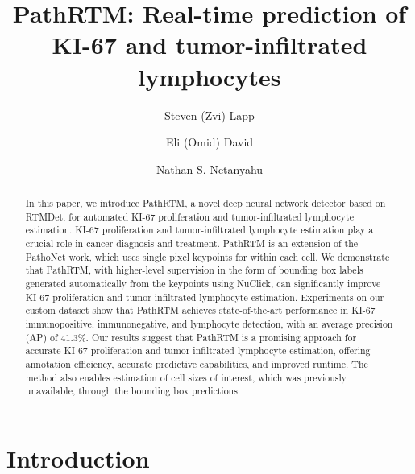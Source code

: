 \documentclass[runningheads]{llncs}
\begin{document}
%
\title{PathRTM: Real-time prediction of KI-67 and tumor-infiltrated lymphocytes}
%
%
\author{Steven (Zvi) Lapp \and
	Eli (Omid) David \and
	Nathan S. Netanyahu}
%
%
%
\maketitle              %
%
\begin{abstract}
	In this paper, we introduce PathRTM, a novel deep neural network detector based on RTMDet, for automated KI-67 proliferation and tumor-infiltrated lymphocyte estimation. KI-67 proliferation and tumor-infiltrated lymphocyte estimation play a crucial role in cancer diagnosis and treatment. PathRTM is an extension of the PathoNet work, which uses single pixel keypoints for within each cell. We demonstrate that PathRTM, with higher-level supervision in the form of bounding box labels generated automatically from the keypoints using NuClick, can significantly improve KI-67 proliferation and tumor-infiltrated lymphocyte estimation. Experiments on our custom dataset show that PathRTM achieves state-of-the-art performance in KI-67 immunopositive, immunonegative, and lymphocyte detection, with an average precision (AP) of 41.3\%. Our results suggest that PathRTM is a promising approach for accurate KI-67 proliferation and tumor-infiltrated lymphocyte estimation, offering annotation efficiency, accurate predictive capabilities, and improved runtime. The method also enables estimation of cell sizes of interest, which was previously unavailable, through the bounding box predictions.
\end{abstract}
%
%
%
\section{Introduction}
\end{document}
